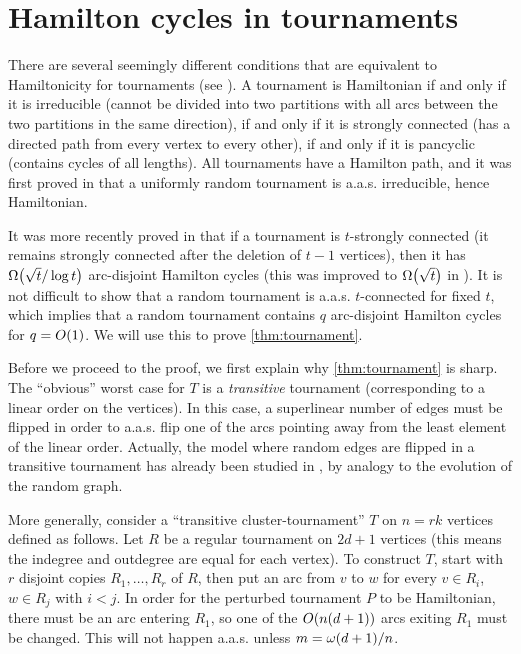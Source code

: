 \documentclass[11pt,english]{article}
\theoremstyle{plain}
\theoremstyle{definition}
\theoremstyle{definition}
\theoremstyle{plain}
\theoremstyle{plain}
\theoremstyle{plain}
\theoremstyle{plain}
\theoremstyle{remark}
\theoremstyle{remark}
\let\originalleft\left
\let\originalright\right
\renewcommand{\left}{\mathopen{}\mathclose\bgroup\originalleft}
\renewcommand{\right}{\aftergroup\egroup\originalright}
\begin{document}
\section{\label{sec:tournaments}Hamilton cycles in tournaments}

There are several seemingly different conditions that are equivalent
to Hamiltonicity for tournaments (see \cite[Chapters~2-3]{Moo68}).
A tournament is Hamiltonian if and only if it is irreducible (cannot
be divided into two partitions with all arcs between the two partitions
in the same direction), if and only if it is strongly connected (has
a directed path from every vertex to every other), if and only if
it is pancyclic (contains cycles of all lengths). All tournaments
have a Hamilton path, and it was first proved in \cite{MM62} that
a uniformly random tournament is a.a.s. irreducible, hence Hamiltonian.

It was more recently proved in \cite{KLOP14} that if a tournament
is $t$-strongly connected (it remains strongly connected after the
deletion of $t-1$ vertices), then it has $\Omega\left(\sqrt{t}/\log t\right)$
arc-disjoint Hamilton cycles (this was improved to $\Omega\left(\sqrt{t}\right)$
in \cite{Pok14}). It is not difficult to show that a random tournament
is a.a.s. $t$-connected for fixed $t$, which implies that a random
tournament contains $q$ arc-disjoint Hamilton cycles for $q=O\left(1\right)$.
We will use this to prove \ref{thm:tournament}.

Before we proceed to the proof, we first explain why \ref{thm:tournament}
is sharp. The ``obvious'' worst case for $T$ is a \emph{transitive}
tournament (corresponding to a linear order on the vertices). In this
case, a superlinear number of edges must be flipped in order to a.a.s.
flip one of the arcs pointing away from the least element of the linear
order. Actually, the model where random edges are flipped in a transitive
tournament has already been studied in \cite{LRG96}, by analogy to
the evolution of the random graph.

More generally, consider a ``transitive cluster-tournament'' $T$
on $n=rk$ vertices defined as follows. Let $R$ be a regular tournament
on $2d+1$ vertices (this means the indegree and outdegree are equal
for each vertex). To construct $T$, start with $r$ disjoint copies
$R_{1},\dots,R_{r}$ of $R$, then put an arc from $v$ to $w$ for
every $v\in R_{i}$, $w\in R_{j}$ with $i<j$. In order for the perturbed
tournament $P$ to be Hamiltonian, there must be an arc entering $R_{1}$,
so one of the $O\left(n\left(d+1\right)\right)$ arcs exiting $R_{1}$
must be changed. This will not happen a.a.s. unless $m=\omega\left(d+1\right)/n$.
\end{document}
